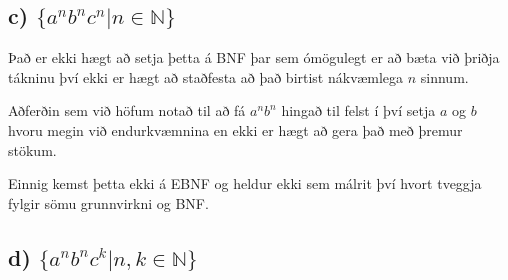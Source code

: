\documentclass[leqno]{article}
\begin{document}
	\subsection{c) $\{a^nb^nc^n|n \in \mathbb{N}\}$}

			Það er ekki hægt að setja þetta á BNF þar sem 
			ómögulegt er að bæta við þriðja tákninu því ekki er 
			hægt að staðfesta að það birtist nákvæmlega $n$ sinnum.

			Aðferðin sem við höfum notað til að fá $a^nb^n$ hingað til 
			felst í því setja $a$ og $b$ hvoru megin við endurkvæmnina 
			en ekki er hægt að gera það með þremur stökum.

			Einnig kemst þetta ekki á EBNF og heldur ekki sem málrit því 
			hvort tveggja fylgir sömu grunnvirkni og BNF.

		\subsection{d) $\{a^nb^nc^k|n,k \in \mathbb{N}\}$}
\end{document}

